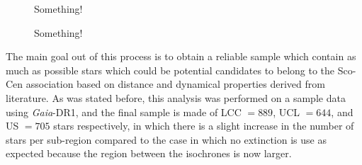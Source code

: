 \begin{figure}[!ht]
\centering
\caption{\scriptsize{Something!}}
\label{fig:Isochrones_3}
\end{figure}

\begin{figure}[!ht]
\centering
\caption{\scriptsize{Something!}}
\label{fig:Isochrones_4}
\end{figure}

The main goal out of this process is to obtain a reliable sample which contain as much as possible stars which could be potential candidates to belong to the Sco-Cen association based on distance and dynamical properties derived from literature. As was stated before, this analysis was performed on a sample data using \textit{Gaia}-DR1, and the final sample is made of LCC $= 889$, UCL $= 644$, and US $= 705$ stars respectively, in which there is a slight increase in the number of stars per sub-region compared to the case in which no extinction is use as expected because the region between the isochrones is now larger.\\

